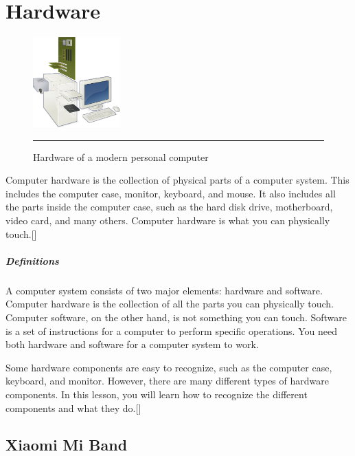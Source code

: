 \section{Hardware}

\begin{figure}
	\begin{center}
		\includegraphics[width=0.3\textwidth]{./images/hardware.jpg}
	\end{center}
	\rule{0.3\textwidth}{0.5pt}
	\caption{Hardware of a modern personal computer}
	\label{fig:hardware}
\end{figure}

Computer hardware is the collection of physical parts of a computer system. This includes the computer case, monitor, keyboard, and mouse. It also includes all the parts inside the computer case, such as the hard disk drive, motherboard, video card, and many others. Computer hardware is what you can physically touch.[\cite{21}]
\subparagraph*{Definitions}
\hfill \break
A computer system consists of two major elements: hardware and software. Computer hardware is the collection of all the parts you can physically touch. Computer software, on the other hand, is not something you can touch. Software is a set of instructions for a computer to perform specific operations. You need both hardware and software for a computer system to work.

Some hardware components are easy to recognize, such as the computer case, keyboard, and monitor. However, there are many different types of hardware components. In this lesson, you will learn how to recognize the different components and what they do.[\cite{20}]
\subsection{Xiaomi Mi Band}

